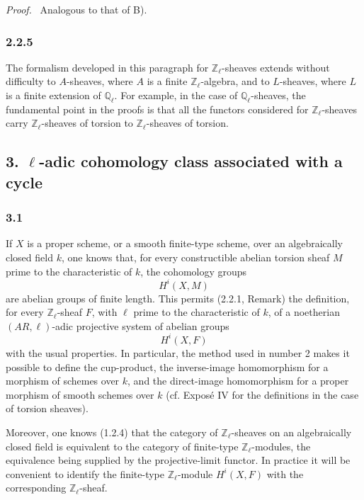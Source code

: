 \documentclass[11pt]{article}
\newenvironment{prooftext}[1][Proof]{\par\noindent\emph{#1.}\ }{\par\medskip}
\begin{document}
\begin{prooftext}[Proof]
Analogous to that of B).
\end{prooftext}

\subsubsection*{2.2.5}
The formalism developed in this paragraph for \(\mathbb Z_\ell\)-sheaves extends without difficulty to \(A\)-sheaves, where \(A\) is a finite \(\mathbb Z_\ell\)-algebra, and to \(L\)-sheaves, where \(L\) is a finite extension of \(\mathbb Q_\ell\). For example, in the case of \(\mathbb Q_\ell\)-sheaves, the fundamental point in the proofs is that all the functors considered for \(\mathbb Z_\ell\)-sheaves carry \(\mathbb Z_\ell\)-sheaves of torsion to \(\mathbb Z_\ell\)-sheaves of torsion.

\subsection*{3. \(\ell\)-adic cohomology class associated with a cycle}

\subsubsection*{3.1}
If \(X\) is a proper scheme, or a smooth finite-type scheme, over an algebraically closed field \(k\), one knows that, for every constructible abelian torsion sheaf \(M\) prime to the characteristic of \(k\), the cohomology groups
\[
H^i(X,M)
\]
are abelian groups of finite length. This permits (2.2.1, Remark) the definition, for every \(\mathbb Z_\ell\)-sheaf \(F\), with \(\ell\) prime to the characteristic of \(k\), of a noetherian \((AR,\ell)\)-adic projective system of abelian groups
\[
H^i(X,F)
\]
with the usual properties. In particular, the method used in number 2 makes it possible to define the cup-product, the inverse-image homomorphism for a morphism of schemes over \(k\), and the direct-image homomorphism for a proper morphism of smooth schemes over \(k\) (cf. Exposé IV for the definitions in the case of torsion sheaves).

Moreover, one knows (1.2.4) that the category of \(\mathbb Z_\ell\)-sheaves on an algebraically closed field is equivalent to the category of finite-type \(\mathbb Z_\ell\)-modules, the equivalence being supplied by the projective-limit functor. In practice it will be convenient to identify the finite-type \(\mathbb Z_\ell\)-module \(H^i(X,F)\) with the corresponding \(\mathbb Z_\ell\)-sheaf.
\end{document}
